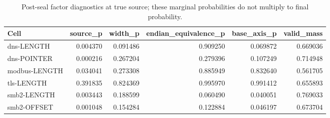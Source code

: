 \begin{table}[t]
\centering
\scriptsize
\caption{Post-seal factor diagnostics at true source; these marginal probabilities do not multiply to final probability.}
\begin{tabular}{lrrrrr}
\toprule
Cell & source\_p & width\_p & endian\_equivalence\_p & base\_axis\_p & valid\_mass \\
\midrule
dns-LENGTH & 0.004370 & 0.091486 & 0.909250 & 0.069872 & 0.669036 \\
dns-POINTER & 0.000216 & 0.267204 & 0.279396 & 0.107249 & 0.714948 \\
modbus-LENGTH & 0.034041 & 0.273308 & 0.885949 & 0.832640 & 0.561705 \\
tls-LENGTH & 0.391835 & 0.824369 & 0.995970 & 0.991412 & 0.655893 \\
smb2-LENGTH & 0.003443 & 0.188599 & 0.060490 & 0.040051 & 0.769033 \\
smb2-OFFSET & 0.001048 & 0.154284 & 0.122884 & 0.046197 & 0.673704 \\
\bottomrule
\end{tabular}
\end{table}
